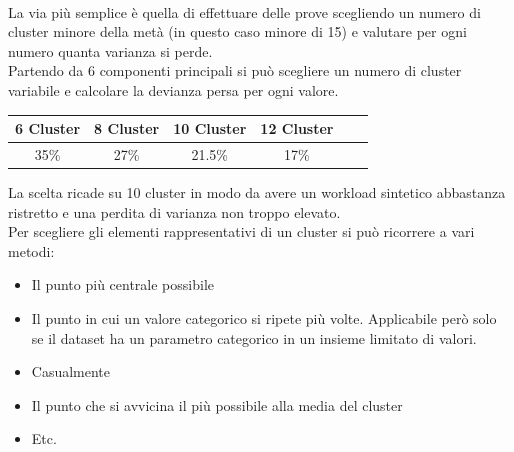 \\La via più semplice è quella di effettuare delle prove scegliendo un numero di cluster minore della metà (in questo caso minore di 15) e valutare per ogni numero quanta varianza si perde.
\\Partendo da 6 componenti principali si può scegliere un numero di cluster variabile e calcolare la devianza persa per ogni valore.
\begin{center}
	\begin{tabular}{|c|c|c|c|c|c|}
		\hline
		\textbf{6 Cluster} & \textbf{8 Cluster} & \textbf{10 Cluster} &\textbf{12 Cluster} \\
		\hline
		35\% & 27\%& 21.5\% & 17\% \\
		\hline
	\end{tabular}
\end{center}
La scelta ricade su 10 cluster in modo da avere un workload sintetico abbastanza ristretto e una perdita di varianza non troppo elevato.
\\Per scegliere gli elementi rappresentativi di un cluster si può ricorrere a vari metodi:
\begin{itemize}
	\item Il punto più centrale possibile
	\item Il punto in cui un valore categorico si ripete più volte. Applicabile però solo se il dataset ha un parametro categorico in un insieme limitato di valori.
	\item Casualmente
	\item Il punto che si avvicina il più possibile alla media del cluster
	\item Etc.
\end{itemize}

